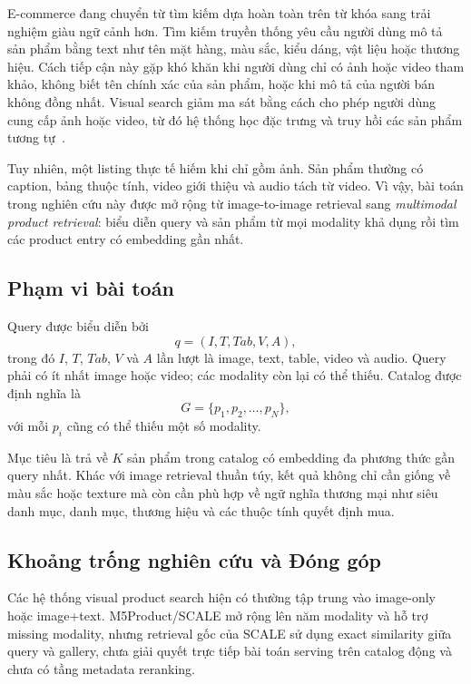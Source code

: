 \documentclass[10pt,conference]{IEEEtran}
\begin{document}
E-commerce đang chuyển từ tìm kiếm dựa hoàn toàn trên từ khóa sang trải nghiệm giàu ngữ cảnh hơn. Tìm kiếm truyền thống yêu cầu người dùng mô tả sản phẩm bằng text như tên mặt hàng, màu sắc, kiểu dáng, vật liệu hoặc thương hiệu. Cách tiếp cận này gặp khó khăn khi người dùng chỉ có ảnh hoặc video tham khảo, không biết tên chính xác của sản phẩm, hoặc khi mô tả của người bán không đồng nhất. Visual search giảm ma sát bằng cách cho phép người dùng cung cấp ảnh hoặc video, từ đó hệ thống học đặc trưng và truy hồi các sản phẩm tương tự~\cite{venkatesan2025}.

Tuy nhiên, một listing thực tế hiếm khi chỉ gồm ảnh. Sản phẩm thường có caption, bảng thuộc tính, video giới thiệu và audio tách từ video. Vì vậy, bài toán trong nghiên cứu này được mở rộng từ image-to-image retrieval sang \emph{multimodal product retrieval}: biểu diễn query và sản phẩm từ mọi modality khả dụng rồi tìm các product entry có embedding gần nhất.

\subsection{Phạm vi bài toán}

Query được biểu diễn bởi
\begin{equation}
q=(I,T,Tab,V,A),
\end{equation}
trong đó $I$, $T$, $Tab$, $V$ và $A$ lần lượt là image, text, table, video và audio. Query phải có ít nhất image hoặc video; các modality còn lại có thể thiếu. Catalog được định nghĩa là
\begin{equation}
G=\{p_1,p_2,\ldots,p_N\},
\end{equation}
với mỗi $p_i$ cũng có thể thiếu một số modality.

Mục tiêu là trả về $K$ sản phẩm trong catalog có embedding đa phương thức gần query nhất. Khác với image retrieval thuần túy, kết quả không chỉ cần giống về màu sắc hoặc texture mà còn cần phù hợp về ngữ nghĩa thương mại như siêu danh mục, danh mục, thương hiệu và các thuộc tính quyết định mua.

\subsection{Khoảng trống nghiên cứu và Đóng góp}

Các hệ thống visual product search hiện có thường tập trung vào image-only hoặc image+text. M5Product/SCALE mở rộng lên năm modality và hỗ trợ missing modality, nhưng retrieval gốc của SCALE sử dụng exact similarity giữa query và gallery, chưa giải quyết trực tiếp bài toán serving trên catalog động và chưa có tầng metadata reranking.
\end{document}
